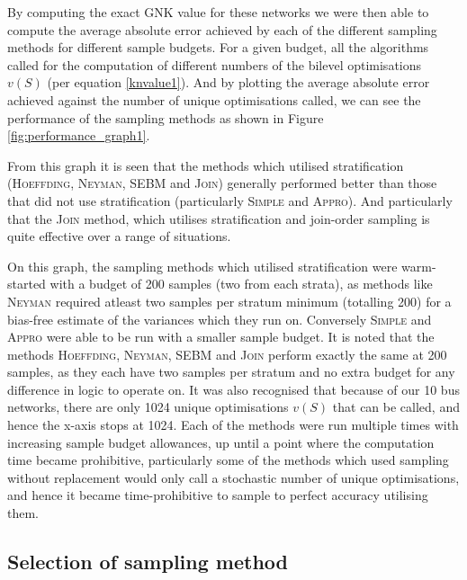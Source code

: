 By computing the exact GNK value for these networks we were then able to compute the average absolute error achieved by each of the different sampling methods for different sample budgets.
For a given budget, all the algorithms called for the computation of different numbers of the bilevel optimisations $v(S)$ (per equation \ref{knvalue1}).
And by plotting the average absolute error achieved against the number of unique optimisations called, we can see the performance of the sampling methods as shown in Figure \ref{fig:performance_graph1}.

From this graph it is seen that the methods which utilised stratification (\textsc{Hoeffding}, \textsc{Neyman}, \textsc{SEBM} and \textsc{Join})  generally performed better than those that did not use stratification (particularly \textsc{Simple} and \textsc{Appro}).
And particularly that the \textsc{Join} method, which utilises stratification and join-order sampling is quite effective over a range of situations.

On this graph, the sampling methods which utilised stratification were warm-started with a budget of 200 samples (two from each strata), as methods like \textsc{Neyman} required atleast two samples per stratum minimum (totalling 200) for a bias-free estimate of the variances which they run on.
Conversely \textsc{Simple} and \textsc{Appro} were able to be run with a smaller sample budget.
It is noted that the methods \textsc{Hoeffding}, \textsc{Neyman}, \textsc{SEBM} and \textsc{Join} perform exactly the same at 200 samples, as they each have two samples per stratum and no extra budget for any difference in logic to operate on.
It was also recognised that because of our 10 bus networks, there are only 1024 unique optimisations $v(S)$ that can be called, and hence the x-axis stops at 1024.
Each of the methods were run multiple times with increasing sample budget allowances, up until a point where the computation time became prohibitive, particularly some of the methods which used sampling without replacement would only call a stochastic number of unique optimisations, and hence it became time-prohibitive to sample to perfect accuracy utilising them.

\subsection{Selection of sampling method}\label{subsection:selection_of_sampling_method}


